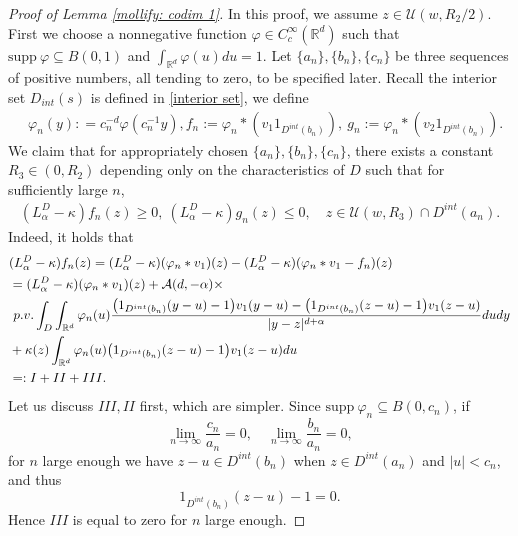 \documentclass[12pt,a4paper]{amsart}
\numberwithin{equation}{section}
\theoremstyle{plain}
\newcommand{\mc}{\mathcal}
\newcommand{\mb}{\mathbb}
\newcommand{\1}{\mathbbm{1}}
\begin{document}
\begin{proof}[Proof of Lemma \ref{mollify: codim 1}]
In this proof, we assume $z\in \mc U(w, R_2/2)$.
     First we choose a nonnegative function $\varphi \in C_c^{\infty}(\mb R^d)$ such that $\text{supp}\ \varphi \subseteq B(0,1)$ and $\int_{\mb R^d} \varphi(u)du = 1$. 
Let $\{a_n\},\{b_n\},\{c_n\}$ be three sequences of positive numbers, all tending to zero, to be specified later.
Recall the interior set $D_{int}(s)$ is defined in \eqref{interior set}, we define
\begin{align*}
& \varphi_n(y): = c_n^{-d} \varphi(c_n^{-1} y),  f_n := \varphi_n *(v_1 1_{D^{int}(b_n)}),\ g_n := \varphi_n *(v_2 1_{D^{int}(b_n)}).
\end{align*}
We claim that for appropriately chosen $\{a_n\},\{b_n\},\{c_n\}$, there exists a constant 
$R_3 \in (0, R_2)$ depending only on the characteristics of $D$ such that for sufficiently large $n$,  
\begin{align*}
(L^D_\alpha-\kappa)f_n(z)\ge 0,\ (L^D_\alpha-\kappa)g_n(z)\le 0, 
\quad z \in \mc U(w, R_3) \cap D^{int}(a_n).
\end{align*}
Indeed, it holds that
\begin{align*}
&(L^D_\alpha-\kappa)f_n(z)=(L^D_\alpha-\kappa)(\varphi_n * v_1)(z)-(L^D_\alpha-\kappa)(\varphi_n * v_1 - f_n)(z) \\
&= (L^D_\alpha-\kappa)(\varphi_n * v_1)(z)+ \mc A(d,-\alpha) \times \\
&  {\ \rm p.v.}\int_{D} \int_{\mb R^d} \varphi_n(u) \frac{\big(1_{D^{int}(b_n)}(y-u)- 1 \big)v_1(y-u) - \big(1_{D^{int}(b_n)}(z-u) - 1 \big)v_1(z-u)}{|y-z|^{d+\alpha}} dudy \\
& + \kappa(z) \int_{\mb R^d} \varphi_n(u)\big(1_{D^{int}(b_n)}(z-u) - 1 \big)v_1(z-u)du\\
& =: I + II + III.
\end{align*}
Let us discuss $III, II$ first, which are simpler. Since $\text{supp}\ \varphi_n \subseteq B(0,c_n)$, if
\begin{equation}\label{sequence assump: 1}
\lim_{n\to \infty} \frac{c_n}{a_n} = 0,\quad \lim_{n\to \infty} \frac{b_n}{a_n} = 0,
\end{equation} 
for $n$ large enough we have $z - u \in D^{int}(b_n)$ when $z \in D^{int}(a_n)$ and $|u|<c_n$, and thus
$$
1_{D^{int}(b_n)}(z-u) - 1 = 0.
$$
Hence $III$ is equal to zero for $n$ large enough. 


\end{proof}
\end{document}
